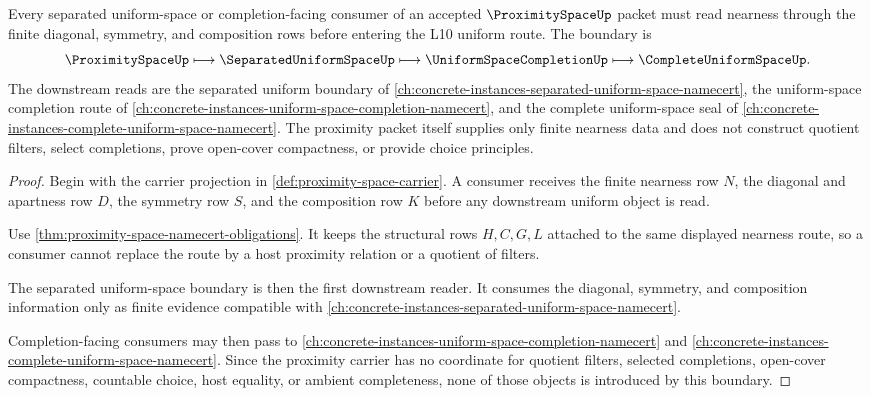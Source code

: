 \begin{theorem}
\label{thm:proximity-space-uniform-completion-boundary}
Every separated uniform-space or completion-facing consumer of an accepted $\ProximitySpaceUp$ packet must read nearness through the finite diagonal, symmetry, and composition rows before entering the L10 uniform route. The boundary is
$$
\ProximitySpaceUp
\longmapsto
\SeparatedUniformSpaceUp
\longmapsto
\UniformSpaceCompletionUp
\longmapsto
\CompleteUniformSpaceUp .
$$
The downstream reads are the separated uniform boundary of \autoref{ch:concrete-instances-separated-uniform-space-namecert}, the uniform-space completion route of \autoref{ch:concrete-instances-uniform-space-completion-namecert}, and the complete uniform-space seal of \autoref{ch:concrete-instances-complete-uniform-space-namecert}. The proximity packet itself supplies only finite nearness data and does not construct quotient filters, select completions, prove open-cover compactness, or provide choice principles.
\end{theorem}
\begin{proof}
Begin with the carrier projection in \autoref{def:proximity-space-carrier}. A consumer receives the finite nearness row $N$, the diagonal and apartness row $D$, the symmetry row $S$, and the composition row $K$ before any downstream uniform object is read.

Use \autoref{thm:proximity-space-namecert-obligations}. It keeps the structural rows $H,C,G,L$ attached to the same displayed nearness route, so a consumer cannot replace the route by a host proximity relation or a quotient of filters.

The separated uniform-space boundary is then the first downstream reader. It consumes the diagonal, symmetry, and composition information only as finite evidence compatible with \autoref{ch:concrete-instances-separated-uniform-space-namecert}.

Completion-facing consumers may then pass to \autoref{ch:concrete-instances-uniform-space-completion-namecert} and \autoref{ch:concrete-instances-complete-uniform-space-namecert}. Since the proximity carrier has no coordinate for quotient filters, selected completions, open-cover compactness, countable choice, host equality, or ambient completeness, none of those objects is introduced by this boundary.
\end{proof}

